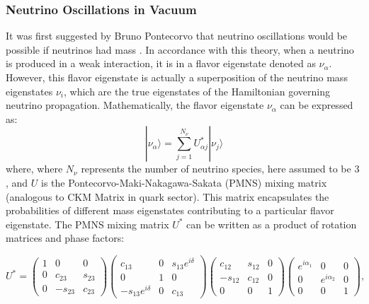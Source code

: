 \subsubsection*{Neutrino Oscillations in Vacuum}
\label{sec:nu_osc_vacuum}
It was first suggested by Bruno Pontecorvo that neutrino oscillations would be possible if neutrinos had mass . In accordance with this theory, when a neutrino is produced in a weak interaction, it is in a flavor eigenstate denoted as $\nu_{\alpha}$. However, this flavor eigenstate is actually a superposition of the neutrino mass eigenstates $\nu_{i}$, which are the true eigenstates of the Hamiltonian governing neutrino propagation. Mathematically, the flavor eigenstate $\nu_{\alpha}$ can be expressed as:
\begin{equation}\label{eq:flav_to_mass}
        |\nu_{\alpha}\rangle = \sum_{j=1}^{N_{\nu}} U_{\alpha j}^* |\nu_j\rangle
\end{equation}
where, where $N_{\nu}$  represents the number of neutrino species, here assumed to be 3 , and $U$ is the Pontecorvo-Maki-Nakagawa-Sakata (PMNS) mixing matrix (analogous to CKM Matrix in quark sector). This matrix encapsulates the probabilities of different mass eigenstates contributing to a particular flavor eigenstate. 
The PMNS mixing matrix $U^*$ can be written as a product of rotation matrices and phase factors:

\begin{equation*}\label{eq:pmns}
U^{*} = \begin{pmatrix}
1 & 0 & 0 \\
0 & c_{23} & s_{23} \\
0 & -s_{23} & c_{23} 
\end{pmatrix}
\begin{pmatrix}
c_{13} & 0 & s_{13} e^{i\delta} \\
0 & 1 & 0 \\
-s_{13} e^{i\delta} & 0 & c_{13} 
\end{pmatrix}
\begin{pmatrix}
c_{12} & s_{12} & 0 \\
-s_{12} & c_{12} & 0 \\
0 & 0 & 1
\end{pmatrix}
\begin{pmatrix}
e^{i\alpha_1} & 0 & 0 \\
0 & e^{i\alpha_2} & 0 \\
0 & 0 & 1
\end{pmatrix},
\end{equation*}

